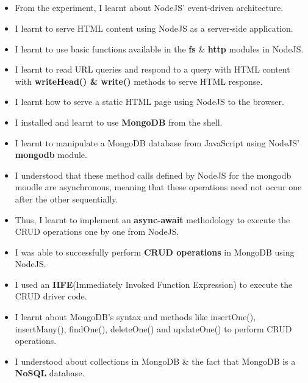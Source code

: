 \documentclass[12pt, a4]{article}
\begin{document}
\subsection*{}
\begin{itemize}

\item From the experiment, I learnt about NodeJS' event-driven architecture.
\item I learnt to serve HTML content using NodeJS as a server-side application.
\item I learnt to use basic functions available in the \textbf{fs} \& \textbf{http} modules in NodeJS.
\item I learnt to read URL queries and respond to a query with HTML content with \textbf{writeHead() \& write()} methods to serve HTML response.
\item I learnt how to serve a static HTML page using NodeJS to the browser.
\item I installed and learnt to use \textbf{MongoDB} from the shell.
\item I learnt to manipulate a MongoDB database from JavaScript using NodeJS' \textbf{mongodb} module.
\item I understood that these method calls defined by NodeJS for the mongodb moudle are asynchronous, meaning that these operations need not occur one after the other sequentially.
\item Thus, I learnt to implement an \textbf{async-await} methodology to execute the CRUD operations one by one from NodeJS.
\item I was able to successfully perform \textbf{CRUD operations} in MongoDB using NodeJS.
\item I used an \textbf{IIFE}(Immediately Invoked Function Expression) to execute the CRUD driver code.
\item I learnt about MongoDB's syntax and methods like insertOne(), insertMany(), findOne(), deleteOne() and updateOne() to perform CRUD operations.
\item I understood about collections in MongoDB \& the fact that MongoDB is a \textbf{NoSQL} database.
\end{itemize}
\end{document}
